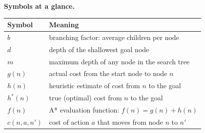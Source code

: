 \documentclass[a4paper,11pt]{article}
\begin{document}
\medskip
\noindent\textbf{Symbols at a glance.}
\begin{center}\small
\begin{tabular}{@{}p{2.5cm}p{10cm}@{}}
\toprule
\textbf{Symbol} & \textbf{Meaning}\\
\midrule
$b$ & branching factor: average children per node\\
$d$ & depth of the shallowest goal node\\
$m$ & maximum depth of any node in the search tree\\
$g(n)$ & actual cost from the start node to node $n$\\
$h(n)$ & heuristic estimate of cost from $n$ to the goal\\
$h^*(n)$ & true (optimal) cost from $n$ to the goal\\
$f(n)$ & A* evaluation function: $f(n) = g(n) + h(n)$\\
$c(n,a,n')$ & cost of action $a$ that moves from node $n$ to $n'$\\
\bottomrule
\end{tabular}
\end{center}
\end{document}
